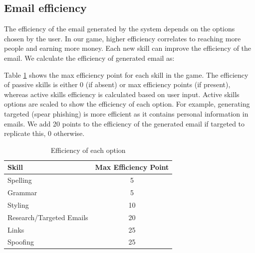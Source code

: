 \subsection{Email efficiency}
The efficiency of the email generated by the system depends on the options chosen by the user. In our game, higher efficiency correlates to reaching more people and earning more money. Each new skill can improve the efficiency of the email. We calculate the efficiency of generated email as:

\begin{center}
\end{center}

Table \ref{tab:efficiency} shows the max efficiency point for each skill in the game. The efficiency of passive skills is either 0 (if absent) or max efficiency points (if present), whereas active skills efficiency is calculated based on user input. Active skills options are scaled to show the efficiency of each option. For example, generating targeted (spear phishing) is more efficient as it contains personal information in emails. We add 20 points to the efficiency of the generated email if targeted to replicate this, 0 otherwise.

\begin{table}[!ht]
    \centering
    \begin{tabular}{l c}
        \hline
        Skill                    & Max Efficiency Point \\
        \hline
        Spelling                 & 5                    \\
        Grammar                  & 5                    \\
        Styling                  & 10                   \\
        Research/Targeted Emails & 20                   \\
        Links                    & 25                   \\
        Spoofing                 & 25                   \\
        \hline
    \end{tabular}%
    \caption{Efficiency of each option}
    \label{tab:efficiency}
\end{table}

